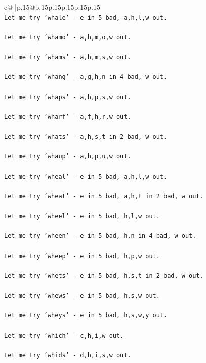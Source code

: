 \documentclass{article}
\begin{document}
{\begin{supertabular}{c@{$\;$}|p{.15\linewidth}@{}p{.15\linewidth}p{.15\linewidth}p{.15\linewidth}p{.15\linewidth}p{.15\linewidth}}
{{{\\ 
\texttt{Let me try 'whale' {-} e in 5 bad, a,h,l,w out. } \\
\\ 
\texttt{Let me try 'whamo' {-} a,h,m,o,w out. } \\
\\ 
\texttt{Let me try 'whams' {-} a,h,m,s,w out. } \\
\\ 
\texttt{Let me try 'whang' {-} a,g,h,n in 4 bad, w out. } \\
\\ 
\texttt{Let me try 'whaps' {-} a,h,p,s,w out. } \\
\\ 
\texttt{Let me try 'wharf' {-} a,f,h,r,w out. } \\
\\ 
\texttt{Let me try 'whats' {-} a,h,s,t in 2 bad, w out. } \\
\\ 
\texttt{Let me try 'whaup' {-} a,h,p,u,w out. } \\
\\ 
\texttt{Let me try 'wheal' {-} e in 5 bad, a,h,l,w out. } \\
\\ 
\texttt{Let me try 'wheat' {-} e in 5 bad, a,h,t in 2 bad, w out. } \\
\\ 
\texttt{Let me try 'wheel' {-} e in 5 bad, h,l,w out. } \\
\\ 
\texttt{Let me try 'wheen' {-} e in 5 bad, h,n in 4 bad, w out. } \\
\\ 
\texttt{Let me try 'wheep' {-} e in 5 bad, h,p,w out. } \\
\\ 
\texttt{Let me try 'whets' {-} e in 5 bad, h,s,t in 2 bad, w out. } \\
\\ 
\texttt{Let me try 'whews' {-} e in 5 bad, h,s,w out. } \\
\\ 
\texttt{Let me try 'wheys' {-} e in 5 bad, h,s,w,y out. } \\
\\ 
\texttt{Let me try 'which' {-} c,h,i,w out. } \\
\\ 
\texttt{Let me try 'whids' {-} d,h,i,s,w out. } \\
\\ 
}}}
\end{supertabular}}
\end{document}
